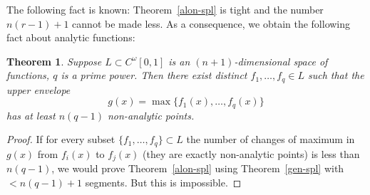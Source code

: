 \documentclass[12pt,a4paper,oneside]{amsart}
\newtheorem{thm}{Theorem}[section]
\theoremstyle{definition}
\theoremstyle{remark}
\numberwithin{equation}{section}
\begin{document}
The following fact is known: Theorem~\ref{alon-spl} is tight and the number $n(r-1)+1$ cannot be made less. As a consequence, we obtain the following fact about analytic functions:

\begin{thm}
Suppose $L\subset C^\omega[0, 1]$ is an $(n+1)$-dimensional space of functions, $q$ is a prime power. Then there exist distinct  $f_1,\ldots, f_q\in L$ such that the upper envelope
$$
g(x) = \max\{f_1(x), \ldots, f_q(x)\}
$$
has at least $n(q-1)$ non-analytic points.
\end{thm}

\begin{proof}
If for every subset $\{f_1,\ldots, f_q\}\subset L$ the number of changes of maximum in $g(x)$ from $f_i(x)$ to $f_j(x)$ (they are exactly non-analytic points) is less than $n(q-1)$, we would prove Theorem~\ref{alon-spl} using Theorem~\ref{gen-spl} with $<n(q-1)+1$ segments. But this is impossible.
\end{proof}
\end{document}

